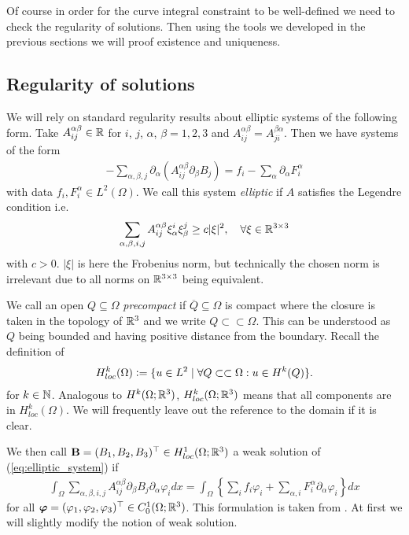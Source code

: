 \documentclass[../master_thesis.tex]{subfiles}
\begin{document}
Of course in order for the curve integral constraint to be well-defined 
we need to check the regularity of solutions. Then using the tools we developed
in the previous sections we will proof existence and uniqueness.

\subsection{Regularity of solutions}\label{sec:regularity_of_solutions}

We will rely on standard regularity results about elliptic systems 
of the following form. Take $A_{ij}^{\alpha \beta} \in \mathbb{R}$
for $i$, $j$, $\alpha$, $\beta = 1,2,3$ and 
$A_{ij}^{\alpha \beta} = A_{ji}^{\beta \alpha}$. Then we have systems of the 
form 
\begin{align}
    -\sum\limits_{\alpha, \beta, j} \partial_\alpha 
        (A_{ij}^{\alpha \beta} \partial_\beta B_j)
    = f_i - \sum\limits_\alpha \partial_\alpha F_i^\alpha
    \label{eq:elliptic_system}
\end{align}
with data $f_i, F_i^\alpha \in L^2(\Omega)$. We call this system 
\textit{elliptic} if $A$ satisfies the Legendre condition i.e.
\begin{align}
    \sum_{\alpha,\beta,i,j}A_{ij}^{\alpha \beta} \xi_\alpha^i \xi_\beta^j
    \geq c |\xi|^2, \quad \forall \xi \in \mathbb{R}^{3 \times 3} 
    \label{eq:legendre_condition}
\end{align}
with $c > 0$. $|\xi|$ is here the Frobenius norm, but technically the chosen 
norm is irrelevant due to all norms on $\mathbb{R}^{3 \times 3}$ being equivalent.

We call an open $Q \subseteq \Omega$ \textit{precompact} if 
$\overline{Q} \subseteq \Omega$ is compact where the closure is taken in the topology of $\mathbb{R}^3$
and we write $Q \subset\subset \Omega$. This can be understood as 
$Q$ being bounded and having positive distance from the boundary.
Recall the definition of 
\begin{align*}
    H^k_{loc}(\Omega) \vcentcolon= \{ u\in L^2 
        \mid \forall Q\subset\subset \Omega: u \in H^k(Q) \}.
\end{align*}
for $k \in \mathbb{N}$.
Analogous to $H^k(\Omega;\mathbb{R}^3)$, $H^k_{loc}(\Omega;\mathbb{R}^3)$ means that 
all components are in $H^k_{loc}(\Omega)$. We will frequently leave out the 
reference to the domain if it is clear.

We then call $\mathbf{B} = (B_1, B_2, B_3)^\top \in H^1_{loc}(\Omega;\mathbb{R}^3)$ a weak solution
of (\ref{eq:elliptic_system}) if 
\begin{align}
    \int_\Omega \sum\limits_{\alpha,\beta,i,j} 
        A_{ij}^{\alpha \beta} \partial_\beta B_j \partial_\alpha \varphi_i dx
    = \int_\Omega \left\{ \sum\limits_i f_i \varphi_i + 
        \sum\limits_{\alpha,i} F_i^\alpha \partial_\alpha \varphi_i \right\} dx
    \label{eq:weak_elliptic_system}
\end{align}
for all $\bm{\varphi} = (\varphi_1, \varphi_2, \varphi_3)^\top \in C^1_0(\Omega;\mathbb{R}^3)$. 
This formulation is taken from 
\cite[Sec. 1.3]{lectures_on_elliptic_pdes}. At first we will slightly modify
the notion of weak solution. 
\end{document}
